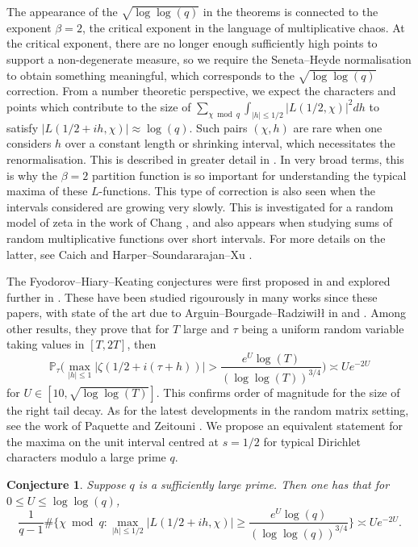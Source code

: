 \documentclass[10pt,a4paper]{amsart}
\newtheorem{conjecture}{Conjecture}
\numberwithin{equation}{section}
\begin{document}
The appearance of the $\sqrt{\log\log(q)}$ in the theorems is connected to the exponent $\beta=2$, the critical exponent in the language of multiplicative chaos. At the critical exponent, there are no longer enough sufficiently high points to support a non-degenerate measure, so we require the Seneta--Heyde normalisation to obtain something meaningful, which corresponds to the $\sqrt{\log\log(q)}$ correction. From a number theoretic perspective, we expect the characters and points which contribute to the size of $\sum_{\chi \bmod{q}}\int_{|h| \leq 1/2}|L(1/2,\chi)|^2dh$ to satisfy $|L(1/2+ih,\chi)| \approx \log(q)$. Such pairs $(\chi,h)$ are rare when one considers $h$ over a constant length or shrinking interval, which necessitates the renormalisation. This is described in greater detail in \cite{sound09}. In very broad terms, this is why the $\beta=2$ partition function is so important for understanding the typical maxima of these $L$-functions. This type of correction is also seen when the intervals considered are growing very slowly. This is investigated for a random model of zeta in the work of Chang \cite{chang2024}, and also appears when studying sums of random multiplicative functions over short intervals. For more details on the latter, see Caich \cite{c24} and Harper--Soundararajan--Xu \cite{hsx26}. \par
The Fyodorov--Hiary--Keating conjectures were first proposed in \cite{fhk12} and explored further in \cite{fk14}. These have been studied rigourously in many works since these papers, with state of the art due to Arguin--Bourgade--Radziwi\l{}\l{} in \cite{abr20} and \cite{abr23}. Among other results, they prove that for $T$ large and $\tau$ being a uniform random variable taking values in $[T,2T]$, then
$$\mathbb{P}_\tau\big(\max_{|h| \leq 1}|\zeta(1/2+i(\tau+h))| > \frac{e^U\log(T)}{(\log\log(T))^{3/4}}\big) \asymp Ue^{-2U}$$
for $U \in [10,\sqrt{\log\log(T)}]$. This confirms order of magnitude for the size of the right tail decay. As for the latest developments in the random matrix setting, see the work of Paquette and Zeitouni \cite{pz22}. We propose an equivalent statement for the maxima on the unit interval centred at $s=1/2$ for typical Dirichlet characters modulo a large prime $q$.
\begin{conjecture} \label{constant_qFHK}
    Suppose $q$ is a sufficiently large prime. Then one has that for $0 \leq U \leq \log\log(q)$,
    \begin{equation} \label{q_count}
        \frac{1}{q-1}\#\big\{\chi \bmod{q}: \max_{|h| \leq 1/2}|L(1/2+ih,\chi)| \geq \frac{e^U\log(q)}{(\log\log(q))^{3/4}} \big\} \asymp Ue^{-2U}.
    \end{equation}
\end{conjecture}
\end{document}
